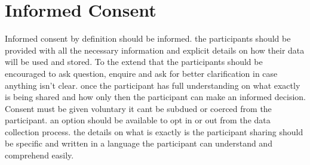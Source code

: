 \documentclass{article}
\begin{document}
	\newpage
\section{Informed Consent}

Informed consent by definition should be informed. the participants should be provided with all the necessary information and explicit details on how their data will be used and stored. To the extend that the participants should be encouraged to ask question, enquire and ask for better clarification in case anything isn't clear. once the participant has full understanding on what exactly is being shared and how only then the participant can make an informed decision. Consent must be given voluntary it cant be subdued or coerced from the participant. an option should be available to opt in or out from the data collection process. the details on what is exactly is the participant sharing should be specific and written in a language the participant can understand and comprehend easily. 
\end{document}
